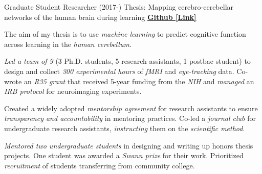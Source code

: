 

\begin{cventries}

  \cventry
    {Graduate Student Researcher (2017-)} %
    {Thesis: Mapping cerebro-cerebellar networks of the human brain during learning}
    {\href{https://github.com/maedbhk/cerebellum_learning_connect}{\textbf{Github [Link]}}}
    {} %
    {
      \begin{cvitems} %
        \item {The aim of my thesis is to use \textit{machine learning} to predict cognitive function across learning in the \textit{human cerebellum}.} 
        \item {\textit{Led a team of 9} (3 Ph.D. students, 5 research assistants, 1 postbac student) to design and collect \textit{300 experimental hours} of \textit{fMRI} and \textit{eye-tracking} data. Co-wrote an \textit{R35 grant} that received 5-year funding from the \textit{NIH} and \textit{managed} an \textit{IRB protocol} for neuroimaging experiments.}
        \item {Created a widely adopted \textit{mentorship agreement} for research assistants to ensure \textit{transparency and accountability} in mentoring practices. Co-led a \textit{journal club} for undergraduate research assistants, \textit{instructing} them on the \textit{scientific method}.}
        \item {\textit{Mentored two undergraduate students} in designing and writing up honors thesis projects. One student was awarded a \textit{Swann prize} for their work. Prioritized \textit{recruitment} of students transferring from community college.}
      \end{cvitems}
    }
    

\end{cventries}
